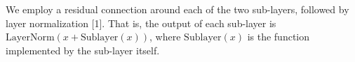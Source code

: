 \documentclass[12pt]{article}
\begin{document}
We employ a residual connection around each of the two sub-layers, followed by layer normalization [1]. That is, the output of each sub-layer is $\mathrm{LayerNorm}(x + \mathrm{Sublayer}(x))$, where $\mathrm{Sublayer}(x)$ is the function implemented by the sub-layer itself.
\end{document}
